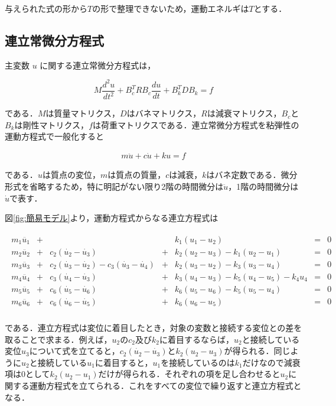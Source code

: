 与えられた式の形から$T$の形で整理できないため，運動エネルギは$T$とする．


\subsection{連立常微分方程式}

主変数 $u$ に関する連立常微分方程式は，

\begin{equation}
    M \frac{d^2 u}{dt^2} + B_c^T R B_c \frac{du}{dt} + B_k^T D B_k = f    
\end{equation}

である．$M$は質量マトリクス，$D$はバネマトリクス，$R$は減衰マトリクス，$B_c$と$B_k$は剛性マトリクス，$f$は荷重マトリクスである．連立常微分方程式を粘弾性の運動方程式で一般化すると

\begin{eqnarray}
    m\ddot{u} + c\dot{u} + ku = f
\end{eqnarray}

である．$u$は質点の変位，$m$は質点の質量，$c$は減衰，$k$はバネ定数である．微分形式を省略するため，特に明記がない限り2階の時間微分は$\ddot{u}$，1階の時間微分は$\dot{u}$で表す．

図\ref{fig:簡易モデル}より，運動方程式からなる連立方程式は

\begin{eqnarray}
    \begin{matrix}
        m_1 \ddot{u_1} &+&  & & k_1 (u_1 - u_2) &=& 0 \\ 
        m_2 \ddot{u_2} &+& c_2(\dot{u_2} - \dot{u_3}) &+& k_2 (u_2 - u_3) - k_1 (u_2 - u_1) &=& 0 \\ 
        m_3 \ddot{u_3} &+& c_2(\dot{u_3} - \dot{u_2}) - c_3(\dot{u_3} - \dot{u_4}) &+& k_2 (u_3 - u_2) - k_3 (u_3 - u_4) &=& 0 \\ 
        m_4 \ddot{u_4} &+& c_3(\dot{u_4} - \dot{u_3}) &+& k_3 (u_4 - u_3) - k_5 (u_4 - u_5) - k_4 u_4 &=& 0 \\ 
        m_5 \ddot{u_5} &+& c_6(\dot{u_5} - \dot{u_6}) &+& k_6 (u_5 - u_6) - k_5 (u_5 - u_4) &=& 0 \\
        m_6 \ddot{u_6} &+& c_6(\dot{u_6} - \dot{u_5}) &+& k_6 (u_6 - u_5) &=& 0 \\
    \end{matrix}        
\end{eqnarray}

である．連立方程式は変位に着目したとき，対象の変数と接続する変位との差を取ることで求まる．例えば，$u_2$の$c_2$及び$k_2$に着目するならば，$u_2$と接続している変位$u_3$について式を立てると，$c_2(\dot{u_2} - \dot{u_3})$と$k_2(u_2 - u_3)$が得られる．同じように$u_2$と接続している$u_1$に着目すると，$u_1$を接続しているのは$k_1$だけなので減衰項は$0$として$k_2(u_2 - u_1)$だけが得られる．それぞれの項を足し合わせると$u_2$に関する運動方程式を立てられる．これをすべての変位で繰り返すと連立方程式となる．

